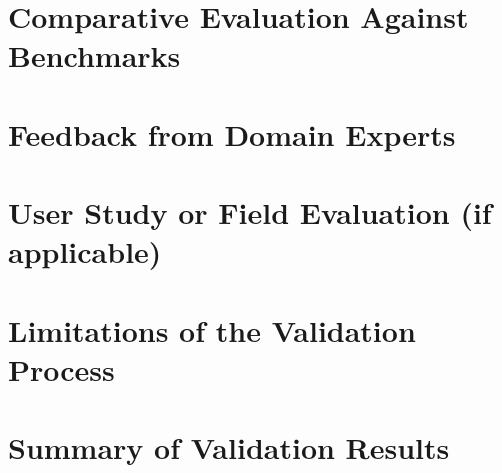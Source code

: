 \section{Comparative Evaluation Against Benchmarks}

\section{Feedback from Domain Experts}

\section{User Study or Field Evaluation (if applicable)}

\section{Limitations of the Validation Process}

\section{Summary of Validation Results}
